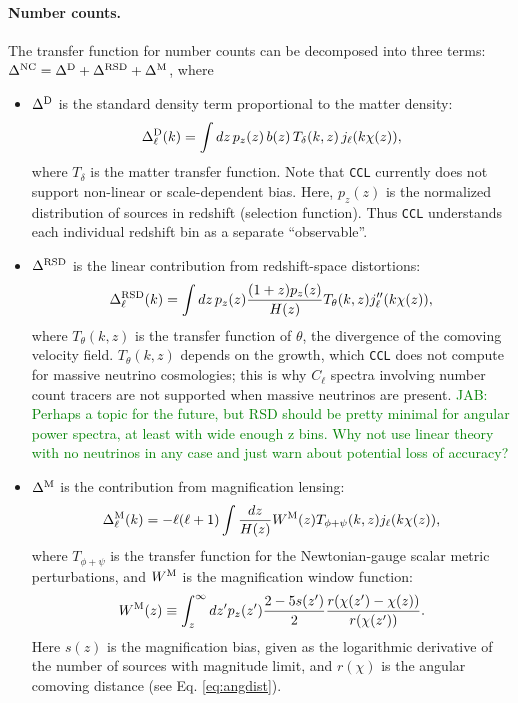 \documentclass[\docopts]{\docclass}
\newcommand{\jab}[1]{\textcolor{green}{JAB: #1}}
\begin{document}
\paragraph{\bf Number counts.} The transfer function for number counts can be decomposed into three terms: $\Delta^{\rm NC}=\Delta^{\rm D}+\Delta^{\rm RSD}+\Delta^{\rm M}$, where
\begin{itemize}
  \item $\Delta^{\rm D}$ is the standard density term proportional to the matter density:
        \begin{equation}
          \Delta^{\rm D}_\ell(k)=\int dz\,p_z(z)\,b(z)\,T_\delta(k,z)\,j_\ell(k\chi(z)),
        \end{equation}
        where $T_\delta$ is the matter transfer function. Note that {\tt CCL} currently does not support non-linear or scale-dependent bias. Here, $p_z(z)$ is the normalized distribution of sources in redshift (selection function). Thus {\tt CCL} understands each individual redshift bin as a separate ``observable''.
  \item $\Delta^{\rm RSD}$ is the linear contribution from redshift-space distortions:
        \begin{equation}
          \Delta^{\rm RSD}_\ell(k)=\int dz\,p_z(z)\frac{(1+z) p_z(z)}{H(z)}T_\theta(k,z) j_\ell''(k\chi(z)),
        \end{equation}
        where $T_\theta(k,z)$ is the transfer function of $\theta$, the divergence of the comoving velocity field. $T_\theta(k,z)$ depends on the growth, which {\tt CCL} does not compute for massive neutrino cosmologies; this is why $C_\ell$ spectra involving number count tracers are not supported when massive neutrinos are present. \jab{Perhaps a topic for the future, but RSD should be pretty minimal for angular power spectra, at least with wide enough z bins. Why not use linear theory with no neutrinos in any case and just warn about potential loss of accuracy?}
  \item $\Delta^{\rm M}$ is the contribution from magnification lensing:
        \begin{equation}
          \Delta_\ell^{\rm M}(k)=-\ell(\ell+1)\int \frac{dz}{H(z)} W^{\rm M}(z) T_{\phi+\psi}(k,z) j_\ell(k\chi(z)),
        \end{equation}
        where $T_{\phi+\psi}$ is the transfer function for the Newtonian-gauge scalar metric perturbations, and $W^{\rm M}$ is the magnification window function:
        \begin{equation}
           W^{\rm M}(z)\equiv\int_z^\infty dz' p_z(z')\frac{2-5s(z')}{2}\frac{r(\chi(z')-\chi(z))}{r(\chi(z'))}.
        \end{equation}
        Here $s(z)$ is the magnification bias, given as the logarithmic derivative of the number of sources with magnitude limit, and $r(\chi)$ is the angular comoving distance (see Eq. \ref{eq:angdist}).


\end{itemize}
\end{document}
